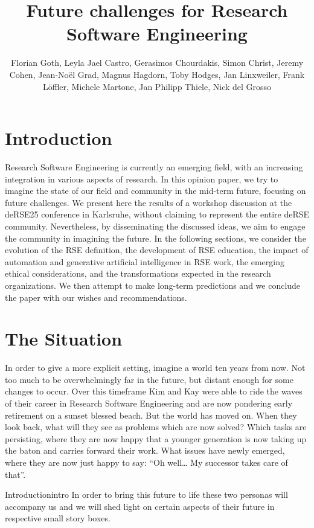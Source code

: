 \documentclass{eceasst}
\title{Future challenges for Research Software Engineering} %
\author{
Florian Goth\texorpdfstring{\autref{1}}{},
Leyla Jael Castro\texorpdfstring{\autref{1}}{},
Gerasimos Chourdakis\texorpdfstring{\autref{1}}{},
Simon Christ\texorpdfstring{\autref{1}}{},
Jeremy Cohen\texorpdfstring{\autref{1}}{},
Jean-Noël Grad\texorpdfstring{\autref{1}}{},
Magnus Hagdorn\texorpdfstring{\autref{1}}{},
Toby Hodges\texorpdfstring{\autref{1}}{},
Jan Linxweiler\texorpdfstring{\autref{1}}{},
Frank Löffler\texorpdfstring{\autref{1}}{},
Michele Martone\texorpdfstring{\autref{1}}{},
Jan Philipp Thiele\texorpdfstring{\autref{1}}{},
Nick del Grosso\texorpdfstring{\autref{1}}{}
} %
\institute{\autlabel{1} Fantasy University} %
\begin{document}
\maketitle

\section{Introduction}

Research Software Engineering is currently an emerging field,
with an increasing integration in various aspects of research.
In this opinion paper, we try to imagine the state of our field
and community in the mid-term future, focusing on future challenges.
We present here the results of a workshop discussion at the
deRSE25 conference in Karlsruhe\cite{Goth2025EndRSEng}, without
claiming to represent the entire deRSE community.
Nevertheless, by disseminating the discussed ideas,
we aim to engage the community in imagining the future.
In the following sections, we consider the evolution of the RSE definition,
the development of RSE education,
the impact of automation and generative artificial intelligence in RSE work,
the emerging ethical considerations,
and the transformations expected in the research organizations.
We then attempt to make long-term predictions
and we conclude the paper with our wishes and recommendations.


\section{The Situation}
In order to give a more explicit setting, imagine a world ten years from now.
Not too much to be overwhelmingly far in the future, but distant enough for some changes to occur.
Over this timeframe Kim\cite{Anzt2021} and Kay\cite{Goth2024}
were able to ride the waves of their career in Research Software Engineering and are now pondering early retirement on a sunset blessed beach.
But the world has moved on.
When they look back, what will they see as problems which are now solved?
Which tasks are persisting, where they are now happy that a younger generation is now taking up the baton and carries forward their work.
What issues have newly emerged, where they are now just happy to say: “Oh well… My successor takes care of that”.
\begin{story}{Introduction}{intro}
In order to bring this future to life these two personas will accompany us and we will shed light on certain aspects
of their future in respective small story boxes.
 \end{story}
\end{document}
